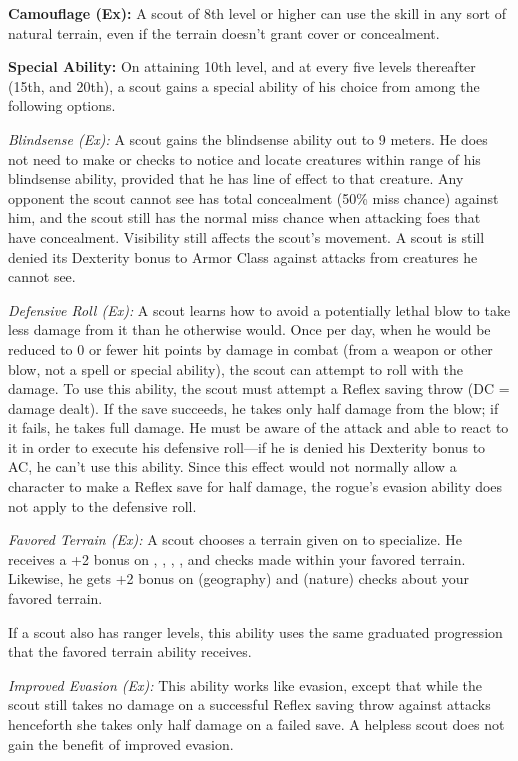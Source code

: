 \textbf{Camouflage (Ex):} A scout of 8th level or higher can use the  skill in any sort of natural terrain, even if the terrain doesn't grant cover or concealment.


\textbf{Special Ability:} On attaining 10th level, and at every five levels thereafter (15th, and 20th), a scout gains a special ability of his choice from among the following options.

\textit{Blindsense (Ex):} A scout gains the blindsense ability out to 9 meters. He does not need to make  or  checks to notice and locate creatures within range of his blindsense ability, provided that he has line of effect to that creature. Any opponent the scout cannot see has total concealment (50\% miss chance) against him, and the scout still has the normal miss chance when attacking foes that have concealment. Visibility still affects the scout's movement. A scout is still denied its Dexterity bonus to Armor Class against attacks from creatures he cannot see.

\textit{Defensive Roll (Ex):} A scout learns how to avoid a potentially lethal blow to take less damage from it than he otherwise would. Once per day, when he would be reduced to 0 or fewer hit points by damage in combat (from a weapon or other blow, not a spell or special ability), the scout can attempt to roll with the damage. To use this ability, the scout must attempt a Reflex saving throw (DC = damage dealt). If the save succeeds, he takes only half damage from the blow; if it fails, he takes full damage. He must be aware of the attack and able to react to it in order to execute his defensive roll---if he is denied his Dexterity bonus to AC, he can't use this ability. Since this effect would not normally allow a character to make a Reflex save for half damage, the rogue's evasion ability does not apply to the defensive roll.

\textit{Favored Terrain (Ex):} A scout chooses a terrain given on  to specialize. He receives a +2 bonus on , , , ,  and  checks made within your favored terrain. Likewise, he gets +2 bonus on  (geography) and  (nature) checks about your favored terrain.

If a scout also has ranger levels, this ability uses the same graduated progression that the favored terrain ability receives.

\textit{Improved Evasion (Ex):} This ability works like evasion, except that while the scout still takes no damage on a successful Reflex saving throw against attacks henceforth she takes only half damage on a failed save. A helpless scout does not gain the benefit of improved evasion.

